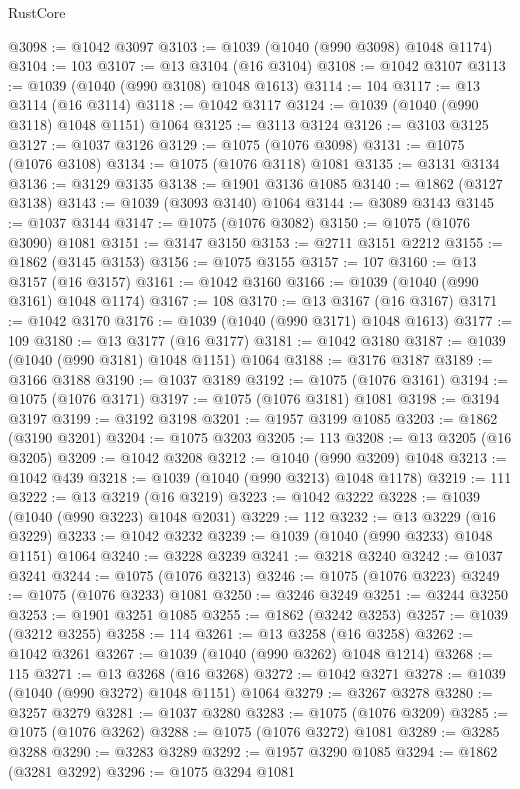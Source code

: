 \begin{lexlean}{RustCore}
\begin{coremodule}
@3098 := @1042 @3097
@3103 := @1039 (@1040 (@990 @3098) @1048 @1174)
@3104 := 103
@3107 := @13 @3104 (@16 @3104)
@3108 := @1042 @3107
@3113 := @1039 (@1040 (@990 @3108) @1048 @1613)
@3114 := 104
@3117 := @13 @3114 (@16 @3114)
@3118 := @1042 @3117
@3124 := @1039 (@1040 (@990 @3118) @1048 @1151) @1064
@3125 := @3113 @3124
@3126 := @3103 @3125
@3127 := @1037 @3126
@3129 := @1075 (@1076 @3098)
@3131 := @1075 (@1076 @3108)
@3134 := @1075 (@1076 @3118) @1081
@3135 := @3131 @3134
@3136 := @3129 @3135
@3138 := @1901 @3136 @1085
@3140 := @1862 (@3127 @3138)
@3143 := @1039 (@3093 @3140) @1064
@3144 := @3089 @3143
@3145 := @1037 @3144
@3147 := @1075 (@1076 @3082)
@3150 := @1075 (@1076 @3090) @1081
@3151 := @3147 @3150
@3153 := @2711 @3151 @2212
@3155 := @1862 (@3145 @3153)
@3156 := @1075 @3155
@3157 := 107
@3160 := @13 @3157 (@16 @3157)
@3161 := @1042 @3160
@3166 := @1039 (@1040 (@990 @3161) @1048 @1174)
@3167 := 108
@3170 := @13 @3167 (@16 @3167)
@3171 := @1042 @3170
@3176 := @1039 (@1040 (@990 @3171) @1048 @1613)
@3177 := 109
@3180 := @13 @3177 (@16 @3177)
@3181 := @1042 @3180
@3187 := @1039 (@1040 (@990 @3181) @1048 @1151) @1064
@3188 := @3176 @3187
@3189 := @3166 @3188
@3190 := @1037 @3189
@3192 := @1075 (@1076 @3161)
@3194 := @1075 (@1076 @3171)
@3197 := @1075 (@1076 @3181) @1081
@3198 := @3194 @3197
@3199 := @3192 @3198
@3201 := @1957 @3199 @1085
@3203 := @1862 (@3190 @3201)
@3204 := @1075 @3203
@3205 := 113
@3208 := @13 @3205 (@16 @3205)
@3209 := @1042 @3208
@3212 := @1040 (@990 @3209) @1048
@3213 := @1042 @439
@3218 := @1039 (@1040 (@990 @3213) @1048 @1178)
@3219 := 111
@3222 := @13 @3219 (@16 @3219)
@3223 := @1042 @3222
@3228 := @1039 (@1040 (@990 @3223) @1048 @2031)
@3229 := 112
@3232 := @13 @3229 (@16 @3229)
@3233 := @1042 @3232
@3239 := @1039 (@1040 (@990 @3233) @1048 @1151) @1064
@3240 := @3228 @3239
@3241 := @3218 @3240
@3242 := @1037 @3241
@3244 := @1075 (@1076 @3213)
@3246 := @1075 (@1076 @3223)
@3249 := @1075 (@1076 @3233) @1081
@3250 := @3246 @3249
@3251 := @3244 @3250
@3253 := @1901 @3251 @1085
@3255 := @1862 (@3242 @3253)
@3257 := @1039 (@3212 @3255)
@3258 := 114
@3261 := @13 @3258 (@16 @3258)
@3262 := @1042 @3261
@3267 := @1039 (@1040 (@990 @3262) @1048 @1214)
@3268 := 115
@3271 := @13 @3268 (@16 @3268)
@3272 := @1042 @3271
@3278 := @1039 (@1040 (@990 @3272) @1048 @1151) @1064
@3279 := @3267 @3278
@3280 := @3257 @3279
@3281 := @1037 @3280
@3283 := @1075 (@1076 @3209)
@3285 := @1075 (@1076 @3262)
@3288 := @1075 (@1076 @3272) @1081
@3289 := @3285 @3288
@3290 := @3283 @3289
@3292 := @1957 @3290 @1085
@3294 := @1862 (@3281 @3292)
@3296 := @1075 @3294 @1081

\end{coremodule}
\end{lexlean}
